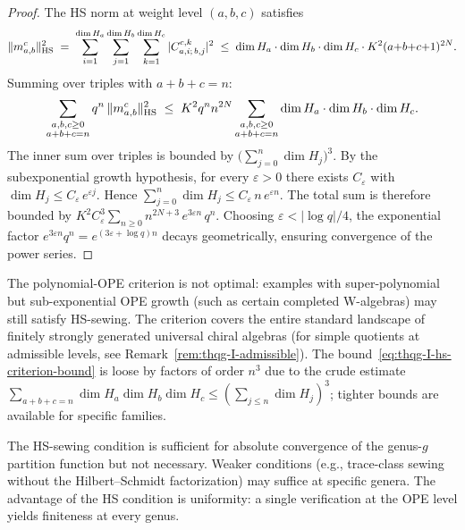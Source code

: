 \begin{proof}
The HS norm at weight level $(a,b,c)$ satisfies
\[
\|m^c_{a,b}\|_{\operatorname{HS}}^2 \;=\; \sum_{i=1}^{\dim H_a} \sum_{j=1}^{\dim H_b} \sum_{k=1}^{\dim H_c} |C^{c,k}_{a,i;\,b,j}|^2 \;\leq\; \dim H_a \cdot \dim H_b \cdot \dim H_c \cdot K^2(a{+}b{+}c{+}1)^{2N}.
\]
Summing over triples with $a + b + c = n$:
\[
\sum_{\substack{a,b,c \geq 0 \\ a+b+c = n}} q^n\,\|m^c_{a,b}\|_{\operatorname{HS}}^2 \;\leq\; K^2 q^n n^{2N} \sum_{\substack{a,b,c \geq 0 \\ a+b+c = n}} \dim H_a \cdot \dim H_b \cdot \dim H_c.
\]
The inner sum over triples is bounded by $\bigl(\sum_{j=0}^n \dim H_j\bigr)^3$. By the subexponential growth hypothesis, for every $\varepsilon > 0$ there exists $C_\varepsilon$ with $\dim H_j \leq C_\varepsilon \,e^{\varepsilon j}$. Hence $\sum_{j=0}^n \dim H_j \leq C_\varepsilon\,n\,e^{\varepsilon n}$. The total sum is therefore bounded by $K^2 C_\varepsilon^3 \sum_{n \geq 0} n^{2N+3}\, e^{3\varepsilon n}\,q^n$. Choosing $\varepsilon < |\log q|/4$, the exponential factor $e^{3\varepsilon n} q^n = e^{(3\varepsilon + \log q)n}$ decays geometrically, ensuring convergence of the power series.
\end{proof}

\begin{remark}
\label{rem:thqg-I-hs-optimality}
The polynomial-OPE criterion is not optimal: examples with super-polynomial but sub-exponential OPE growth (such as certain completed W-algebras) may still satisfy HS-sewing. The criterion covers the entire standard landscape of finitely strongly generated universal chiral algebras (for simple quotients at admissible levels, see Remark~\ref{rem:thqg-I-admissible}). The bound~\eqref{eq:thqg-I-hs-criterion-bound} is loose by factors of order $n^3$ due to the crude estimate $\sum_{a+b+c=n} \dim H_a \dim H_b \dim H_c \leq (\sum_{j \leq n} \dim H_j)^3$; tighter bounds are available for specific families.
\end{remark}

\begin{remark}
\label{rem:thqg-I-gap-hs}
The HS-sewing condition is sufficient for absolute convergence of the genus-$g$ partition function but not necessary. Weaker conditions (e.g., trace-class sewing without the Hilbert--Schmidt factorization) may suffice at specific genera. The advantage of the HS condition is uniformity: a single verification at the OPE level yields finiteness at every genus.
\end{remark}

